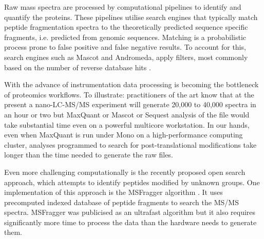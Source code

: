 \documentclass[default]{sn-jnl}
\theoremstyle{thmstyleone}%
\theoremstyle{thmstyletwo}%
\theoremstyle{thmstylethree}%
\begin{document}
Raw mass spectra are processed by computational pipelines to identify and quantify the proteins. These pipelines utilise search engines that typically match peptide fragmentation spectra to the theoretically predicted sequence specific fragments, i.e. predicted from genomic sequences. Matching is a probabilistic process prone to false positive and false negative results. To account for this, search engines such as Mascot and Andromeda, apply filters, most commonly based on the number of reverse database hits \cite{RN25, RN26}. 

With the advance of instrumentation data processing is becoming the bottleneck of proteomics workflows. To illustrate: practitioners of the art know that at the present a nano-LC-MS/MS experiment will generate 20,000 to 40,000 spectra in an hour or two but MaxQuant  or Mascot or Sequest analysis of the file would take substantial time even on a powerful multicore workstation. In our hands, even when MaxQuant is run under Mono on a high-performance computing cluster, analyses programmed to search for post-translational modifications take longer than the time needed to generate the raw files.

Even more challenging computationally is the recently proposed open search approach, which attempts to identify peptides modified by unknown groups. One implementation of this approach is the MSFragger algorithm \cite {RN3}. It uses precomputed indexed database of peptide fragments to search the MS/MS spectra. MSFragger was publicised as an ultrafast algorithm but it also requires significantly more time to process the data than the hardware needs to generate them. 
\end{document}
